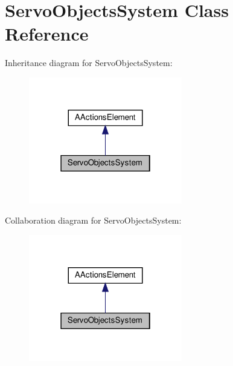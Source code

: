 \hypertarget{classServoObjectsSystem}{}\section{Servo\+Objects\+System Class Reference}
\label{classServoObjectsSystem}


Inheritance diagram for Servo\+Objects\+System\+:
\nopagebreak
\begin{figure}[H]
\begin{center}
\leavevmode
\includegraphics[width=190pt]{classServoObjectsSystem__inherit__graph}
\end{center}
\end{figure}


Collaboration diagram for Servo\+Objects\+System\+:
\nopagebreak
\begin{figure}[H]
\begin{center}
\leavevmode
\includegraphics[width=190pt]{classServoObjectsSystem__coll__graph}
\end{center}
\end{figure}
